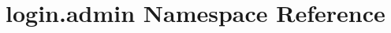 \hypertarget{namespacelogin_1_1admin}{\section{login.\-admin Namespace Reference}
\label{namespacelogin_1_1admin}
}
